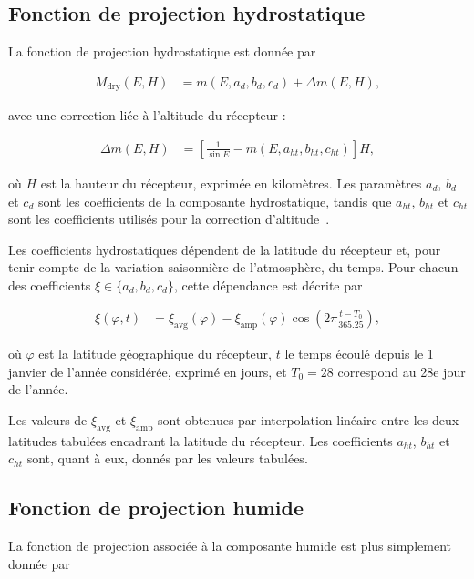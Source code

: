 \subsection*{Fonction de projection hydrostatique}

La fonction de projection hydrostatique est donnée par

\begin{align}
M_{\mathrm{dry}}(E,H)
&=
m(E,a_d,b_d,c_d)
+
\Delta m(E,H),
\label{eq:nmf_hydrostatic}
\end{align}

avec une correction liée à l'altitude du récepteur :

\begin{align}
\Delta m(E,H)
&=
\left[
\frac{1}{\sin E}
-
m(E,a_{ht},b_{ht},c_{ht})
\right]H,
\label{eq:nmf_height}
\end{align}

où $H$ est la hauteur du récepteur, exprimée en kilomètres.
Les paramètres $a_d$, $b_d$ et $c_d$ sont les coefficients de la composante
hydrostatique, tandis que $a_{ht}$, $b_{ht}$ et $c_{ht}$ sont les coefficients
utilisés pour la correction d'altitude~\cite{niell1996}.

Les coefficients hydrostatiques dépendent de la latitude du récepteur et,
pour tenir compte de la variation saisonnière de l'atmosphère, du temps.
Pour chacun des coefficients $\xi \in \{a_d,b_d,c_d\}$, cette dépendance est
décrite par

\begin{align}
\xi(\varphi,t)
&=
\xi_{\mathrm{avg}}(\varphi)
-
\xi_{\mathrm{amp}}(\varphi)
\cos\left(
2\pi\frac{t-T_0}{365.25}
\right),
\label{eq:nmf_time}
\end{align}

où $\varphi$ est la latitude géographique du récepteur, $t$ le temps écoulé
depuis le 1 janvier de l'année considérée, exprimé en jours, et $T_0=28$
correspond au 28e jour de l'année.

Les valeurs de $\xi_{\mathrm{avg}}$ et $\xi_{\mathrm{amp}}$ sont obtenues par
interpolation linéaire entre les deux latitudes tabulées encadrant la
latitude du récepteur. Les coefficients $a_{ht}$, $b_{ht}$ et $c_{ht}$ sont,
quant à eux, donnés par les valeurs tabulées.

\subsection*{Fonction de projection humide}

La fonction de projection associée à la composante humide est plus
simplement donnée par

